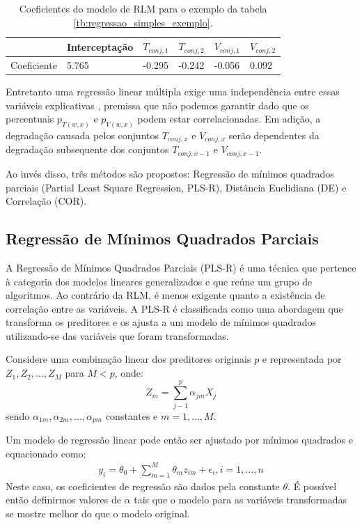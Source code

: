 \begin{table}[H]
	\centering
	\begin{tabular}{@{}l|l|l|l|l|l@{}}
		\toprule
		& Interceptação & $T_{conj,1}$ & $T_{conj,2}$ & $V_{conj,1}$ & $V_{conj,2}$ \\ \midrule
		Coeficiente & 5.765 & -0.295 & -0.242 & -0.056 & 0.092 \\ \bottomrule
	\end{tabular}
	\caption{Coeficientes do modelo de RLM para o exemplo da tabela \ref{tb:regressao_simples_exemplo}.}
	\label{tb:regressao_multipla_coeficientes}
\end{table}
Entretanto uma regressão linear múltipla exige uma independência entre essas variáveis explicativas \cite{Chatterjee}, premissa que não podemos garantir dado que os percentuais $p_{T(w,x)}$ e $p_{V(w,x)}$ podem estar correlacionadas. Em adição, a degradação causada pelos conjuntos $T_{conj,x}$ e $V_{conj,x}$ serão dependentes da degradação subsequente dos conjuntos $T_{conj,x-1}$ e $V_{conj,x-1}$.

Ao invés disso, três métodos são propostos: Regressão de mínimos quadrados parciais (Partial Least Square Regression, PLS-R), Distância Euclidiana (DE) e Correlação (COR).
\subsection{Regressão de Mínimos Quadrados Parciais}
\label{subsection_estimativas_PLSR}
A Regressão de Mínimos Quadrados Parciais (PLS-R) é uma técnica que pertence à categoria dos modelos lineares generalizados e que reúne um grupo de algoritmos. Ao contrário da RLM, é menos exigente quanto a existência de correlação entre as variáveis. A PLS-R é classificada como uma abordagem que transforma os preditores e os ajusta a um modelo de mínimos quadrados utilizando-se das variáveis que foram transformadas.

Considere uma combinação linear dos preditores originais $p$ e representada por $Z_1,Z_2,\dots,Z_M$ para $M < p$, onde:
\begin{equation}
Z_m = \sum_{j-1}^{p}\alpha_{jm}X_j
\label{eq:combinacoes_lineares}
\end{equation}
sendo $\alpha_{1m},\alpha_{2m},\dots,\alpha_{pm}$ constantes e $m=1,\dots,M$.

Um modelo de regressão linear pode então ser ajustado por mínimos quadrados e equacionado como:
\begin{eqnarray}
y_i=\theta_0+\sum_{m=1}^{M}\theta_mz_{im}+\epsilon_i, i=1,\dots,n
\label{eq:RLM_PLS}
\end{eqnarray}
Neste caso, os coeficientes de regressão são dados pela constante $\theta$. É possível então definirmos valores de $\alpha$ tais que o modelo para as variáveis transformadas se mostre melhor do que o modelo original.

